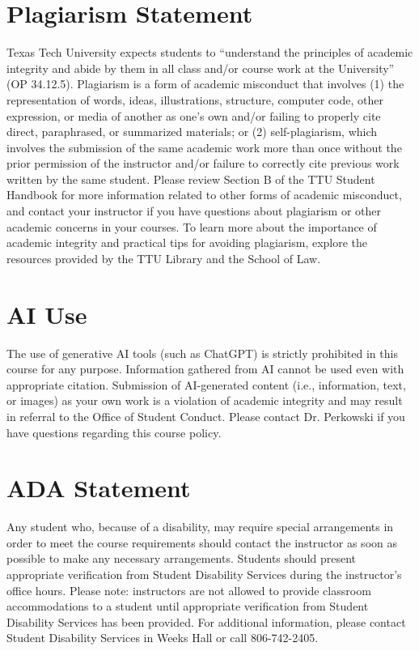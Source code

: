 \documentclass[12pt, notitlepage]{article}   	%
\begin{document}
{\section{Plagiarism Statement}
Texas Tech University expects students to “understand the principles of academic integrity and abide by them in all class and/or course work at the University” (OP 34.12.5). Plagiarism is a form of academic misconduct that involves (1) the representation of words,  ideas, illustrations, structure, computer code, other expression, or media of another as one's own and/or failing to properly cite direct, paraphrased, or summarized materials; or (2) self-plagiarism, which involves the submission of the same academic work more than once without the prior permission of the instructor and/or failure to correctly cite previous work written by the same student. Please review Section B of the TTU Student Handbook for more information related to other forms of academic misconduct, and contact your instructor if you have questions about plagiarism or other academic concerns in your courses. To learn more about the importance of academic integrity and practical tips for avoiding plagiarism, explore the resources provided by the TTU Library and the School of Law.

\section{AI Use}
The use of generative AI tools (such as ChatGPT) is strictly prohibited in this course for any purpose. Information gathered from AI cannot be used even with appropriate citation. Submission of AI-generated content (i.e., information, text, or images) as your own work is a violation of academic integrity and may result in referral to the Office of Student Conduct. Please contact Dr. Perkowski if you have questions regarding this course policy.

\section{ADA Statement}
Any student who, because of a disability, may require special arrangements in order to meet the course requirements should contact the instructor as soon as possible to make any necessary arrangements. Students should present appropriate verification from Student Disability Services during the instructor’s office hours. Please note: instructors are not allowed to provide classroom accommodations to a student until appropriate verification from Student Disability Services has been provided. For additional information, please contact Student Disability Services in Weeks Hall or call 806-742-2405.

}
\end{document}
